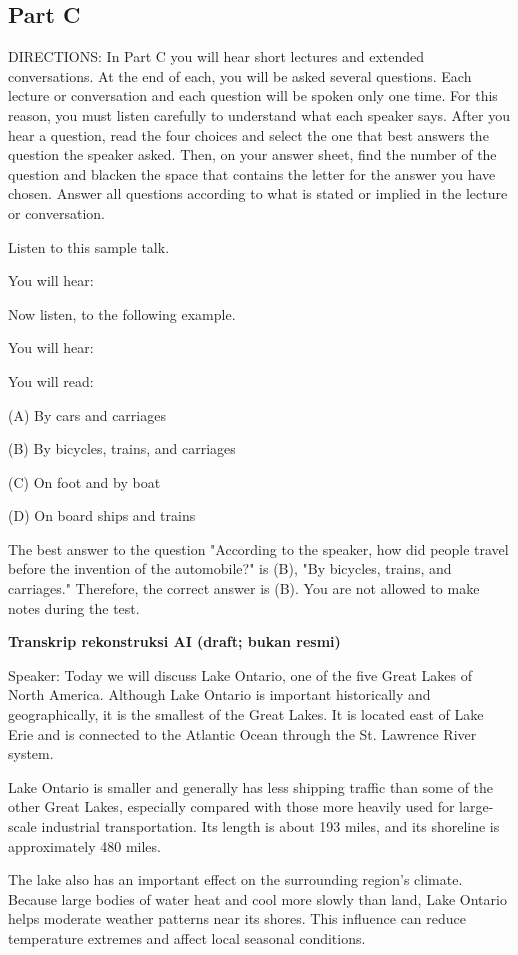 \documentclass[12pt]{article}
\begin{document}
\subsection*{Part C}
DIRECTIONS: In Part C you will hear short lectures and extended conversations. At the end of each, you will be asked several questions. Each lecture or conversation and each question will be spoken only one time. For this reason, you must listen carefully to understand what each speaker says. After you hear a question, read the four choices and select the one that best answers the question the speaker asked. Then, on your answer sheet, find the number of the question and blacken the space that contains the letter for the answer you have chosen. Answer all questions according to what is stated or implied in the lecture or conversation.\par
\begin{exampleblock}
Listen to this sample talk.\par
You will hear:\par
Now listen, to the following example.\par
You will hear:\par
You will read:\par
(A) By cars and carriages\par
(B) By bicycles, trains, and carriages\par
(C) On foot and by boat\par
(D) On board ships and trains\par
The best answer to the question "According to the speaker, how did people travel before the invention of the automobile?" is (B), "By bicycles, trains, and carriages." Therefore, the correct answer is (B). You are not allowed to make notes during the test.\par
\end{exampleblock}
\begin{exampleblock}
\textbf{Transkrip rekonstruksi AI (draft; bukan resmi)}\par
Speaker: Today we will discuss Lake Ontario, one of the five Great Lakes of North America. Although Lake Ontario is important historically and geographically, it is the smallest of the Great Lakes. It is located east of Lake Erie and is connected to the Atlantic Ocean through the St. Lawrence River system.\par
Lake Ontario is smaller and generally has less shipping traffic than some of the other Great Lakes, especially compared with those more heavily used for large-scale industrial transportation. Its length is about 193 miles, and its shoreline is approximately 480 miles.\par
The lake also has an important effect on the surrounding region's climate. Because large bodies of water heat and cool more slowly than land, Lake Ontario helps moderate weather patterns near its shores. This influence can reduce temperature extremes and affect local seasonal conditions.\par
\end{exampleblock}
\end{document}
